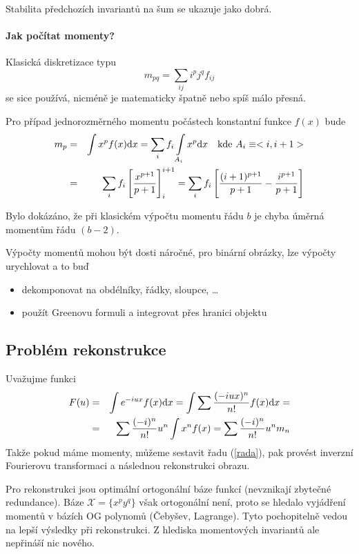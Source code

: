 Stabilita předchozích invariantů na šum se ukazuje jako dobrá. 
\paragraph{Jak počítat momenty?}
Klasická diskretizace typu 
\begin{equation}
m_{pq}=\sum\limits_{ij}i^pj^qf_{ij}
\end{equation}
\noindent se sice používá, nicméně je
matematicky špatně nebo spíš málo přesná.

Pro případ jednorozměrného momentu počástech konstantní funkce $f(x)$ bude
\begin{eqnarray}
m_p&=&\int x^p f(x){\rm d} x=\sum\limits_{i}f_i\int\limits_{A_i}x^p{\rm d} x\quad\hbox{kde $A_i\equiv<i,i+1>$}\\
&=&\sum\limits_{i}f_i\left[\frac{x^{p+1}}{p+1}\right]^{i+1}_i=\sum\limits_{i}f_i
\left[\frac{(i+1)^{p+1}}{p+1}-\frac{i^{p+1}}{p+1}\right]
\end{eqnarray}

Bylo dokázáno, že při klasickém výpočtu momentu řádu $b$ je chyba úměrná momentům řádu $(b-2)$. 

Výpočty momentů mohou být dosti náročné, pro binární obrázky, lze výpočty urychlovat a to buď
\begin{itemize}
\item dekomponovat na obdélníky, řádky, sloupce, \dots
\item použít Greenovu formuli a integrovat přes hranici objektu
\end{itemize}

\subsection{Problém rekonstrukce}

Uvažujme funkci
\begin{eqnarray}
F(u)&=&\int e^{-iux}f(x){\rm d} x=\int\sum\frac{(-iux)^n}{n!}f(x){\rm d} x=\nonumber\\
&=&\sum\frac{(-i)^n}{n!}u^n\int x^nf(x)=\sum\frac{(-i)^n}{n!}u^n m_n\label{rada}
\end{eqnarray}
\noindent Takže pokud máme momenty, můžeme sestavit řadu (\ref{rada}), pak provést inverzní Fourierovu 
transformaci a následnou rekonstrukci obrazu.

Pro rekonstrukci jsou optimální ortogonální báze funkcí (nevznikají zbytečné redundance).
Báze $\mathcal{X}=\{x^py^q\}$ však ortogonální není, proto se hledalo vyjádření momentů
v bázích OG polynomů (Čebyšev, Lagrange). Tyto pochopitelně vedou na lepší výsledky při rekonstrukci.
Z hlediska momentových invariantů ale nepřináší nic nového.

